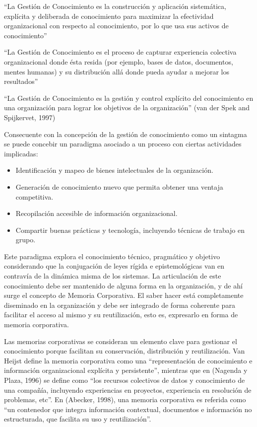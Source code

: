 “La Gestión de Conocimiento es la construcción y aplicación sistemática, explícita y deliberada de conocimiento para maximizar la efectividad organizacional con respecto al conocimiento, por lo que usa sus activos de conocimiento”\cite{wiig1993}

“La Gestión de Conocimiento es el proceso de capturar experiencia colectiva organizacional donde ésta resida (por ejemplo, bases de datos, documentos, mentes humanas) y su distribución allá donde pueda ayudar a mejorar los resultados”\cite{hibbard1997}

“La Gestión de Conocimiento es la gestión y control explícito del conocimiento en una organización para lograr los objetivos de la organización” (van der Spek and Spijkervet, 1997)

Consecuente con la concepción de la gestión de conocimiento como un sintagma se puede concebir un paradigma asociado a un proceso con ciertas actividades implicadas: 

\begin{itemize}
\item Identificación y mapeo de bienes intelectuales de la organización.
\item Generación de conocimiento nuevo que permita obtener una ventaja competitiva. 
\item Recopilación accesible de información organizacional. 
\item Compartir buenas prácticas y tecnología, incluyendo técnicas de trabajo en grupo.
\end{itemize}

Este paradigma explora el conocimiento técnico, pragmático y objetivo considerando que la conjugación de leyes rígida e epistemológicas van en contravía de la dinámica misma de los sistemas. La articulación de este conocimiento debe ser mantenido de alguna forma en la organización, y de ahí surge el concepto de Memoria Corporativa. El saber hacer está completamente diseminado en la organización y debe ser integrado de forma coherente para facilitar el acceso al mismo y su reutilización, esto es, expresarlo en forma de memoria corporativa. 

Las memorias corporativas se consideran un elemento clave para gestionar el conocimiento porque facilitan su conservación, distribución y reutilización. Van Heijst define la memoria corporativa como una “representación de conocimiento e información organizacional explícita y persistente”, mientras que en (Nagenda y Plaza, 1996) se define como “los recursos colectivos de datos y conocimiento de una compañía, incluyendo experiencias en proyectos, experiencia en resolución de problemas, etc”. En (Abecker, 1998), una memoria corporativa es referida como “un contenedor que integra información contextual, documentos e información no estructurada, que facilita su uso y reutilización”.

